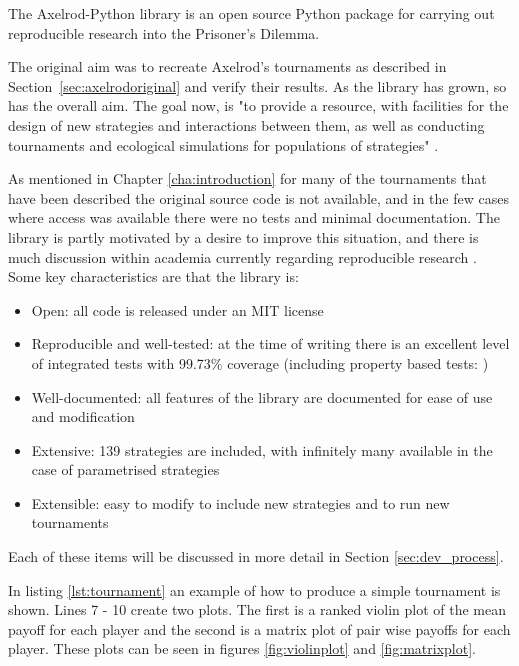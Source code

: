 The Axelrod-Python library \cite{axelrodproject} is an open source Python
package for carrying out reproducible research into the Prisoner's Dilemma.

The original aim was to recreate Axelrod's tournaments as described in Section~\ref{sec:axelrodoriginal} and verify their results.
As the library has grown, so has the overall aim.
The goal now, is "to provide a resource, with facilities for the design of new strategies and interactions between them, as well as conducting tournaments and ecological simulations for populations of strategies" \cite{Knight2016}.

As mentioned in Chapter \ref{cha:introduction} for many of the tournaments that have been described the original source code is not available, and in the few cases where access was available there were no tests and minimal documentation.
The library is partly motivated by a desire to improve this situation, and there is much discussion within academia currently regarding reproducible research \cite{Crick2014, Hong2015, Procter2012, Sandve2013}.
Some key characteristics are that the library is:

\begin{itemize}
    \item Open: all code is released under an MIT license \cite{Rosen2004}
    \item Reproducible and well-tested: at the time of writing there is an excellent level of integrated tests with 99.73\% coverage (including property based tests: \cite{Hypothesis3.6.1})
    \item Well-documented: all features of the library are documented for ease of use and modification
    \item Extensive: 139 strategies are included, with infinitely many available in the case of parametrised strategies
    \item Extensible: easy to modify to include new strategies and to run new tournaments
\end{itemize}

Each of these items will be discussed in more detail in Section \ref{sec:dev_process}.

In listing \ref{lst:tournament} an example of how to produce a simple tournament is shown.
Lines 7 - 10 create two plots.
The first is a ranked violin plot of the mean payoff for each player and the second is a matrix plot of pair wise payoffs for each player.
These plots can be seen in figures \ref{fig:violinplot} and \ref{fig:matrixplot}.

